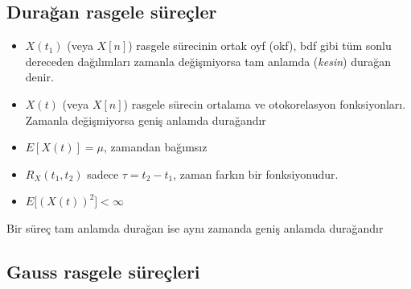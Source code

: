 \documentclass[11pt,a4paper]{article}
\begin{document}
\subsection{Durağan rasgele süreçler}
\begin{itemize}
  \item $X(t_1)$ (veya $X[n]$) rasgele sürecinin ortak oyf (okf), bdf gibi tüm sonlu dereceden dağılımları zamanla değişmiyorsa tam anlamda (\textit{kesin}) durağan denir.
  \item $X(t)$ (veya $X[n]$) rasgele sürecin ortalama ve otokorelasyon fonksiyonları. Zamanla değişmiyorsa geniş anlamda durağandır
  \item $E[X(t)]=\mu$, zamandan bağımsız
  \item $R_X(t_1,t_2)$ sadece $\tau=t_2-t_1$, zaman farkın bir fonksiyonudur.
  \item $E\big[(X(t))^2\big]<\infty$
\end{itemize}
Bir süreç tam anlamda durağan ise aynı zamanda geniş anlamda durağandır

\subsection{Gauss rasgele süreçleri}
\end{document}
